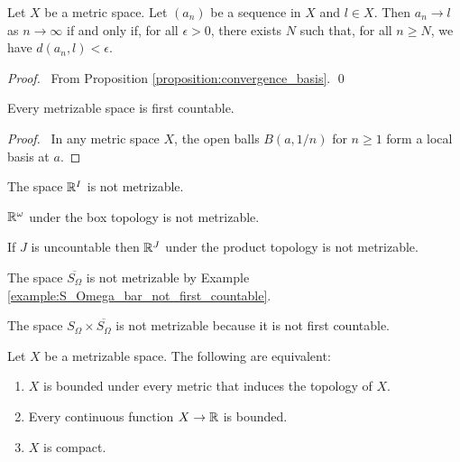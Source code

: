 \begin{proposition}
    \label{proposition:convergence_metric}
    Let $X$ be a metric space. Let $(a_n)$ be a sequence in $X$ and $l \in X$.
    Then $a_n \rightarrow l$ as $n \rightarrow \infty$ if and only if,
    for all $\epsilon > 0$, there exists $N$ such that, for all $n \geq N$,
    we have $d(a_n, l) < \epsilon$.
\end{proposition}

\begin{proof}
    \pf\ From Proposition \ref{proposition:convergence_basis}. \qed
\end{proof}

\begin{proposition}
    \label{proposition:metrizable_first_countable}
    Every metrizable space is first countable.
\end{proposition}

\begin{proof}
    \pf\ In any metric space $X$, the open balls $B(a,1/n)$ for $n \geq 1$ form a local basis at $a$.
\end{proof}

\begin{corollary}
    The space $\mathbb{R}^I$ is not metrizable.
\end{corollary}

\begin{example}
    $\mathbb{R}^\omega$ under the box topology is not metrizable.
\end{example}

\begin{example}
    If $J$ is uncountable then $\mathbb{R}^J$ under the product topology is not metrizable.
\end{example}

\begin{example}
    The space $\overline{S_\Omega}$ is not metrizable by Example \ref{example:S_Omega_bar_not_first_countable}.
\end{example}

\begin{example}
    The space $S_\Omega \times \overline{S_\Omega}$ is not metrizable because it is not first countable.
\end{example}

\begin{proposition}[Choice]
    Let $X$ be a metrizable space. The following are equivalent:
    \begin{enumerate}
        \item $X$ is bounded under every metric that induces the topology of $X$.
        \item Every continuous function $X \rightarrow \mathbb{R}$ is bounded.
        \item $X$ is compact.
    \end{enumerate}
\end{proposition}

